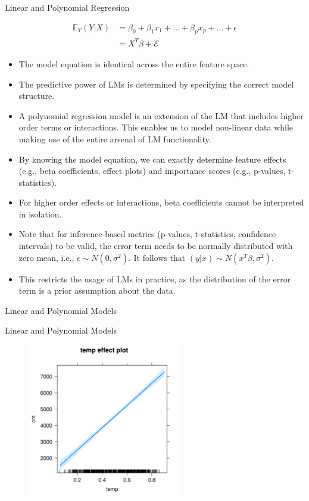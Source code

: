 \documentclass[11pt,compress,t,notes=noshow, xcolor=table]{beamer}
\begin{document}
\begin{vbframe}{Linear and Polynomial Regression}

\begin{align*}
\mathbb{E}_Y(Y \vert X) &= \beta_0 + \beta_1 x_1 + \dots + \beta_p x_p + \dots + \epsilon \\
 &= X^T\beta + \mathcal{E}
\end{align*}

\begin{itemize}
\itemsep2em
\item The model equation is identical across the entire feature space.
\item The predictive power of LMs is determined by specifying the correct model structure.
\item
A polynomial regression model is an extension of the LM that includes higher order terms or interactions. This enables us to model non-linear data while making use of the entire arsenal of LM functionality.
\item
By knowing the model equation, we can exactly determine feature effects (e.g., beta coefficients, effect plots) and importance scores (e.g., p-values, t-statistics).
\item For higher order effects or interactions, beta coefficients cannot be interpreted in isolation.
\item Note that for inference-based metrics (p-values, t-statistics, confidence intervals) to be valid, the error term needs to be normally distributed with zero mean, i.e., $\epsilon \sim N(0, \sigma^2)$. It follows that $(y \vert x) \sim N(x^T \beta, \sigma^2)$.
\item This restricts the usage of LMs in practice, as the distribution of the error term is a prior assumption about the data.
\end{itemize}
\end{vbframe}

\begin{vbframe}{Linear and Polynomial Models}
\tiny

\end{vbframe}

\begin{vbframe}{Linear and Polynomial Models}
\begin{figure}
  \includegraphics[width = 0.6\textwidth]{figure/lm_effect_plot.png}
\end{figure}
\end{vbframe}
\end{document}
